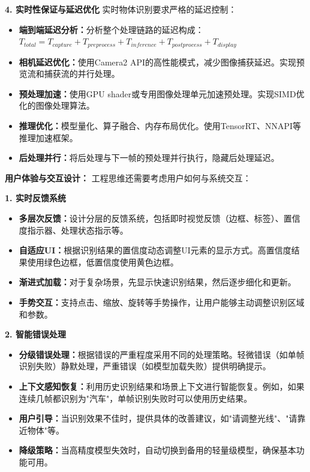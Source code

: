 \textbf{4. 实时性保证与延迟优化}
实时物体识别要求严格的延迟控制：
\begin{itemize}
\item \textbf{端到端延迟分析：}分析整个处理链路的延迟构成：$T_{total} = T_{capture} + T_{preprocess} + T_{inference} + T_{postprocess} + T_{display}$
\item \textbf{相机延迟优化：}使用Camera2 API的高性能模式，减少图像捕获延迟。实现预览流和捕获流的并行处理。
\item \textbf{预处理加速：}使用GPU shader或专用图像处理单元加速预处理。实现SIMD优化的图像处理算法。
\item \textbf{推理优化：}模型量化、算子融合、内存布局优化。使用TensorRT、NNAPI等推理加速框架。
\item \textbf{后处理并行：}将后处理与下一帧的预处理并行执行，隐藏后处理延迟。
\end{itemize}

\textbf{用户体验与交互设计：}
工程思维还需要考虑用户如何与系统交互：

\textbf{1. 实时反馈系统}
\begin{itemize}
\item \textbf{多层次反馈：}设计分层的反馈系统，包括即时视觉反馈（边框、标签）、置信度指示器、处理状态指示等。
\item \textbf{自适应UI：}根据识别结果的置信度动态调整UI元素的显示方式。高置信度结果使用绿色边框，低置信度使用黄色边框。
\item \textbf{渐进式加载：}对于复杂场景，先显示快速识别结果，然后逐步细化和更新。
\item \textbf{手势交互：}支持点击、缩放、旋转等手势操作，让用户能够主动调整识别区域和参数。
\end{itemize}

\textbf{2. 智能错误处理}
\begin{itemize}
\item \textbf{分级错误处理：}根据错误的严重程度采用不同的处理策略。轻微错误（如单帧识别失败）静默处理，严重错误（如模型加载失败）提供明确提示。
\item \textbf{上下文感知恢复：}利用历史识别结果和场景上下文进行智能恢复。例如，如果连续几帧都识别为"汽车"，单帧识别失败时可以使用历史结果。
\item \textbf{用户引导：}当识别效果不佳时，提供具体的改善建议，如"请调整光线"、"请靠近物体"等。
\item \textbf{降级策略：}当高精度模型失效时，自动切换到备用的轻量级模型，确保基本功能可用。
\end{itemize}

